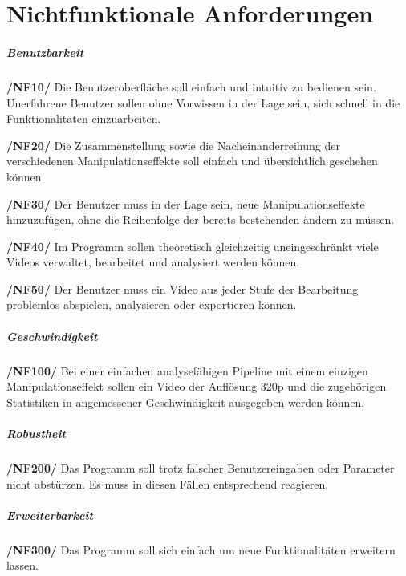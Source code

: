 \section{Nichtfunktionale Anforderungen}

\subparagraph{Benutzbarkeit}
\begin{description}
	\item \textbf{/NF10/} Die Benutzeroberfläche soll einfach und intuitiv zu bedienen sein. Unerfahrene Benutzer sollen ohne Vorwissen in der Lage sein, sich schnell in die Funktionalitäten einzuarbeiten.
	\item \textbf{/NF20/} Die Zusammenstellung sowie die Nacheinanderreihung der verschiedenen Manipulationseffekte soll einfach und übersichtlich geschehen können. 
	\item \textbf{/NF30/} Der Benutzer muss in der Lage sein, neue Manipulationseffekte hinzuzufügen, ohne die Reihenfolge der bereits bestehenden ändern zu müssen.
	\item \textbf{/NF40/} Im Programm sollen theoretisch gleichzeitig uneingeschränkt viele Videos verwaltet, bearbeitet und analysiert werden können.
	\item \textbf{/NF50/} Der Benutzer muss ein Video aus jeder Stufe der Bearbeitung problemlos abspielen, analysieren oder exportieren können.
\end{description}

\subparagraph{Geschwindigkeit}

\begin{description}
	\item \textbf{/NF100/} Bei einer einfachen analysefähigen Pipeline mit einem einzigen Manipulationseffekt sollen ein Video der Auflösung 320p und die zugehörigen Statistiken in angemessener Geschwindigkeit
 ausgegeben werden können.
\end{description}

\subparagraph{Robustheit}

\begin{description}
	\item \textbf{/NF200/} Das Programm soll trotz falscher Benutzereingaben oder Parameter nicht abstürzen. Es muss in diesen Fällen entsprechend reagieren.
\end{description}

\subparagraph{Erweiterbarkeit}

\begin{description}
	\item \textbf{/NF300/} Das Programm soll sich einfach um neue Funktionalitäten erweitern lassen.
\end{description}

 
